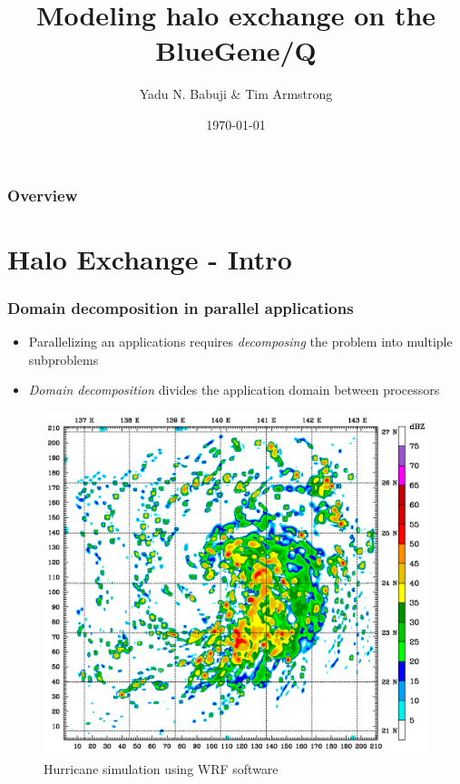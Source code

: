 \documentclass{beamer}
\title[Halo exchange on BG/Q]{Modeling halo exchange on the BlueGene/Q} %
\author{Yadu N. Babuji \& Tim Armstrong} %
\institute[Dept. of Computer Science]
{
The University of Chicago \\
\medskip
}
\date{\today} %
\begin{document}
\begin{frame}
\titlepage %
\end{frame}

\begin{frame}
\frametitle{Overview} %
\tableofcontents %
\end{frame}


\section{Halo Exchange - Intro} %

\begin{frame}
\frametitle{Domain decomposition in parallel applications}
\begin{itemize}
  \item Parallelizing an applications requires
      \emph{decomposing} the problem into multiple subproblems
  \item \emph{Domain decomposition} divides the application domain
      between processors
\end{itemize}
\vspace{-1.0em}
\begin{figure}
  \centering
  \caption{Hurricane simulation using WRF software}
    \includegraphics[width=0.45\linewidth]{img/Typhoon_Mawar_2005_computer_simulation-frame24}

\end{figure}
\end{frame}
\end{document}
